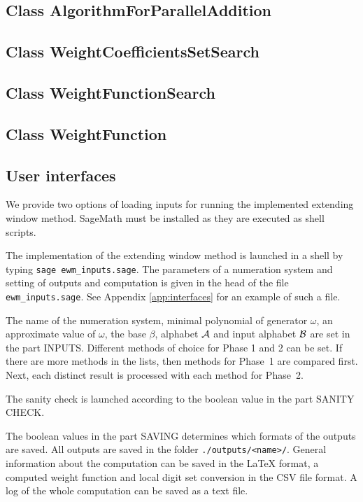 \subsection*{Class AlgorithmForParallelAddition}



\subsection*{Class WeightCoefficientsSetSearch}



\subsection*{Class WeightFunctionSearch}



\subsection*{Class WeightFunction}



\subsection*{User interfaces}
We provide two options of loading inputs for running the implemented extending window method. SageMath must be installed as they are executed as shell scripts.

The implementation of the extending window method is launched in a shell by typing \verb+sage ewm_inputs.sage+. The parameters of a numeration system and setting of outputs and computation is given in the head of the file \verb+ewm_inputs.sage+. See Appendix \ref{app:interfaces} for an example of such a file.


The name of the numeration system, minimal polynomial of generator $\omega$, an approximate value of $\omega$, the base $\beta$, alphabet $\mathcal{A}$ and input alphabet $\mathcal{B}$ are set in the part INPUTS. Different methods of choice for Phase 1 and 2 can be set. If there are more methods in the lists, then methods for Phase~1 are compared first. Next, each distinct result is processed with each method for Phase~2.  

The sanity check is launched according to the boolean value in the part SANITY CHECK. 

The boolean values in the part SAVING determines which formats of the outputs are saved. All outputs are saved in the folder \verb+./outputs/<name>/+. General information about the computation can be saved in the \LaTeX{} format, a computed weight function and local digit set conversion in the CSV file format.  A log of the whole computation can be saved as a text file.

